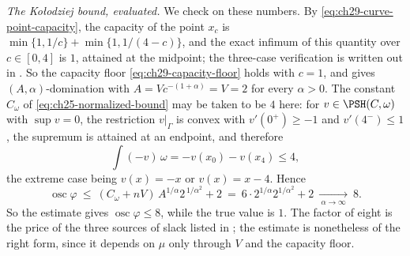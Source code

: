 \begin{example}
\emph{The Ko\l odziej bound, evaluated.}  We check
 on these numbers.  By
\eqref{eq:ch29-curve-point-capacity}, the capacity of the point $x_c$ is
$\min\{1,1/c\}+\min\{1,1/(4-c)\}$, and the exact infimum of this quantity
over $c\in[0,4]$ is $1$, attained at the midpoint; the three-case
verification is written out in .  So the
capacity floor \eqref{eq:ch29-capacity-floor} holds with $c=1$, and
 gives $(A,\alpha)$-domination with
$A=Vc^{-(1+\alpha)}=V=2$ for every $\alpha>0$.  The constant
$C_\omega$ of
\eqref{eq:ch25-normalized-bound} may be taken to be $4$ here: for
$v\in\PSH(C,\omega)$ with $\sup v=0$, the restriction $v|_\Gamma$ is
convex with $v'(0^+)\geq-1$ and $v'(4^-)\leq1$, the supremum is attained
at an endpoint, and therefore
\[
 \int(-v)\,\omega=-v(x_0)-v(x_4)\leq4 ,
\]
the extreme case being $v(x)=-x$ or $v(x)=x-4$.  Hence
\begin{equation}
\label{eq:ch29-curve-kolodziej-numbers}
 \operatorname{osc}\varphi
 \ \leq\ (C_\omega+nV)\,A^{1/\alpha}2^{\,1/\alpha^2}+2
 \ =\ 6\cdot2^{1/\alpha}2^{1/\alpha^2}+2
 \ \xrightarrow[\ \alpha\to\infty\ ]{}\ 8 .
\end{equation}
So the estimate gives $\operatorname{osc}\varphi\leq8$, while the true
value is $1$.  The factor of eight is the price of the three sources of
slack listed in ; the estimate is nonetheless
of the right form, since it depends on $\mu$ only through $V$ and the
capacity floor.
\end{example}

